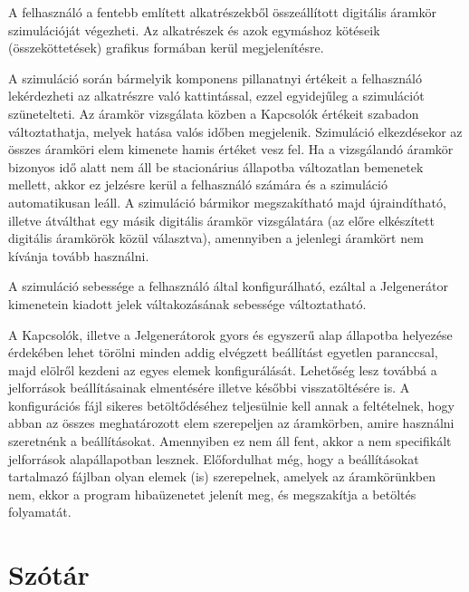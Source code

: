 A felhasználó a fentebb említett alkatrészekből összeállított digitális áramkör szimulációját végezheti. Az alkatrészek és azok egymáshoz kötéseik (összeköttetések) grafikus formában kerül megjelenítésre.

A szimuláció során bármelyik komponens pillanatnyi értékeit a felhasználó lekérdezheti az alkatrészre való kattintással, ezzel egyidejűleg a szimulációt szünetelteti. Az áramkör vizsgálata közben a Kapcsolók értékeit szabadon változtathatja, melyek hatása valós időben megjelenik. Szimuláció elkezdésekor az összes áramköri elem kimenete hamis értéket vesz fel. Ha a vizsgálandó áramkör bizonyos idő alatt nem áll be stacionárius állapotba változatlan bemenetek mellett, akkor ez jelzésre kerül a felhasználó számára és a szimuláció automatikusan leáll. A szimuláció bármikor megszakítható majd újraindítható, illetve átválthat egy másik digitális áramkör vizsgálatára (az előre elkészített digitális áramkörök közül választva), amennyiben a jelenlegi áramkört nem kívánja tovább használni.

A szimuláció sebessége a felhasználó által konfigurálható, ezáltal a Jelgenerátor kimenetein kiadott jelek váltakozásának sebessége változtatható.

 A Kapcsolók, illetve a Jelgenerátorok gyors és egyszerű alap állapotba helyezése érdekében lehet törölni minden addig elvégzett beállítást egyetlen paranccsal, majd elölről kezdeni az egyes elemek konfigurálását. Lehetőség lesz továbbá a jelforrások beállításainak elmentésére illetve későbbi visszatöltésére is. A konfigurációs fájl sikeres betöltődéséhez teljesülnie kell annak a feltételnek, hogy abban az összes meghatározott elem szerepeljen az áramkörben, amire használni szeretnénk a beállításokat. Amennyiben ez nem áll fent, akkor a nem specifikált jelforrások alapállapotban lesznek. Előfordulhat még, hogy a beállításokat tartalmazó fájlban olyan elemek (is) szerepelnek, amelyek az áramkörünkben nem, ekkor a program hibaüzenetet jelenít meg, és megszakítja a betöltés folyamatát.

\section{Szótár}
\label{sec:dictionary}

